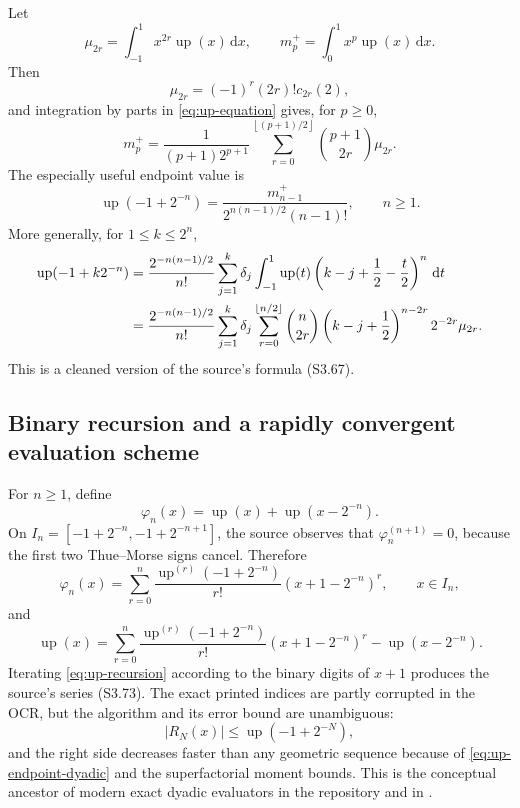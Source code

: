 \documentclass[11pt,oneside]{article}
\theoremstyle{definition}
\theoremstyle{remark}
\newcommand{\Up}{\operatorname{up}}
\newcommand{\dd}{\,\mathrm d}
\newcommand{\floor}[1]{\left\lfloor #1\right\rfloor}
\begin{document}
Let
\begin{equation}
 \mu_{2r}=\int_{-1}^{1}x^{2r}\Up(x)\dd x,
 \qquad
 m_p^+=\int_0^1x^p\Up(x)\dd x.
 \label{eq:up-moments}
\end{equation}
Then
\begin{equation}
 \mu_{2r}=(-1)^r(2r)!c_{2r}(2),
 \tag{S3.65}
 \label{eq:up-even-moment}
\end{equation}
and integration by parts in \eqref{eq:up-equation} gives, for $p\ge0$,
\begin{equation}
 m_p^+=\frac1{(p+1)2^{p+1}}
 \sum_{r=0}^{\floor{(p+1)/2}}
 \binom{p+1}{2r}\mu_{2r}.
 \label{eq:half-moment-recurrence}
\end{equation}
The especially useful endpoint value is
\begin{equation}
 \Up(-1+2^{-n})=
 \frac{m_{n-1}^+}{2^{n(n-1)/2}(n-1)!},
 \qquad n\ge1.
 \tag{S3.68}
 \label{eq:up-endpoint-dyadic}
\end{equation}
More generally, for $1\le k\le2^n$,
\begin{align}
 \Up(-1+k2^{-n})
 &=\frac{2^{-n(n-1)/2}}{n!}
 \sum_{j=1}^{k}\delta_j
 \int_{-1}^{1}\Up(t)
 \left(k-j+\frac12-\frac t2\right)^n\dd t \notag\\
 &=\frac{2^{-n(n-1)/2}}{n!}
 \sum_{j=1}^{k}\delta_j
 \sum_{r=0}^{\floor{n/2}}
 \binom n{2r}\left(k-j+\frac12\right)^{n-2r}2^{-2r}\mu_{2r}.
 \label{eq:up-general-dyadic}
\end{align}
This is a cleaned version of the source's formula (S3.67).

\subsection{Binary recursion and a rapidly convergent evaluation scheme}

For $n\ge1$, define
\begin{equation}
 \varphi_n(x)=\Up(x)+\Up(x-2^{-n}).
 \label{eq:phi-n}
\end{equation}
On
$I_n=[-1+2^{-n},-1+2^{-n+1}]$, the source observes that
$\varphi_n^{(n+1)}=0$, because the first two Thue--Morse signs cancel.  Therefore
\begin{equation}
 \varphi_n(x)=\sum_{r=0}^{n}
 \frac{\Up^{(r)}(-1+2^{-n})}{r!}(x+1-2^{-n})^r,
 \qquad x\in I_n,
 \tag{S3.70}
 \label{eq:phi-polynomial}
\end{equation}
and
\begin{equation}
 \Up(x)=\sum_{r=0}^{n}
 \frac{\Up^{(r)}(-1+2^{-n})}{r!}(x+1-2^{-n})^r
 -\Up(x-2^{-n}).
 \tag{S3.71}
 \label{eq:up-recursion}
\end{equation}
Iterating \eqref{eq:up-recursion} according to the binary digits of $x+1$ produces the
source's series (S3.73).  The exact printed indices are partly corrupted in the OCR, but the
algorithm and its error bound are unambiguous:
\begin{equation}
 |R_N(x)|\le\Up(-1+2^{-N}),
 \label{eq:binary-remainder}
\end{equation}
and the right side decreases faster than any geometric sequence because of
\eqref{eq:up-endpoint-dyadic} and the superfactorial moment bounds.  This is the conceptual
ancestor of modern exact dyadic evaluators in the repository and in \cite{haugland2016}.
\end{document}
